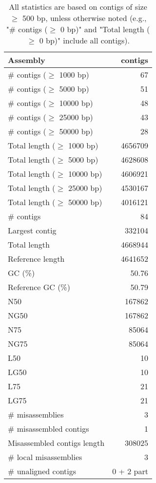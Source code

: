 \documentclass[12pt,a4paper]{article}
\begin{document}
\begin{table}[ht]
\begin{center}
\caption{All statistics are based on contigs of size $\geq$ 500 bp, unless otherwise noted (e.g., "\# contigs ($\geq$ 0 bp)" and "Total length ($\geq$ 0 bp)" include all contigs).}
\begin{tabular}{|l*{1}{|r}|}
\hline
Assembly & contigs \\ \hline
\# contigs ($\geq$ 1000 bp) & 67 \\ \hline
\# contigs ($\geq$ 5000 bp) & 51 \\ \hline
\# contigs ($\geq$ 10000 bp) & 48 \\ \hline
\# contigs ($\geq$ 25000 bp) & 43 \\ \hline
\# contigs ($\geq$ 50000 bp) & 28 \\ \hline
Total length ($\geq$ 1000 bp) & 4656709 \\ \hline
Total length ($\geq$ 5000 bp) & 4628608 \\ \hline
Total length ($\geq$ 10000 bp) & 4606921 \\ \hline
Total length ($\geq$ 25000 bp) & 4530167 \\ \hline
Total length ($\geq$ 50000 bp) & 4016121 \\ \hline
\# contigs & 84 \\ \hline
Largest contig & 332104 \\ \hline
Total length & 4668944 \\ \hline
Reference length & 4641652 \\ \hline
GC (\%) & 50.76 \\ \hline
Reference GC (\%) & 50.79 \\ \hline
N50 & 167862 \\ \hline
NG50 & 167862 \\ \hline
N75 & 85064 \\ \hline
NG75 & 85064 \\ \hline
L50 & 10 \\ \hline
LG50 & 10 \\ \hline
L75 & 21 \\ \hline
LG75 & 21 \\ \hline
\# misassemblies & 3 \\ \hline
\# misassembled contigs & 1 \\ \hline
Misassembled contigs length & 308025 \\ \hline
\# local misassemblies & 3 \\ \hline
\# unaligned contigs & 0 + 2 part \\ \hline

\end{tabular}
\end{center}
\end{table}
\end{document}
